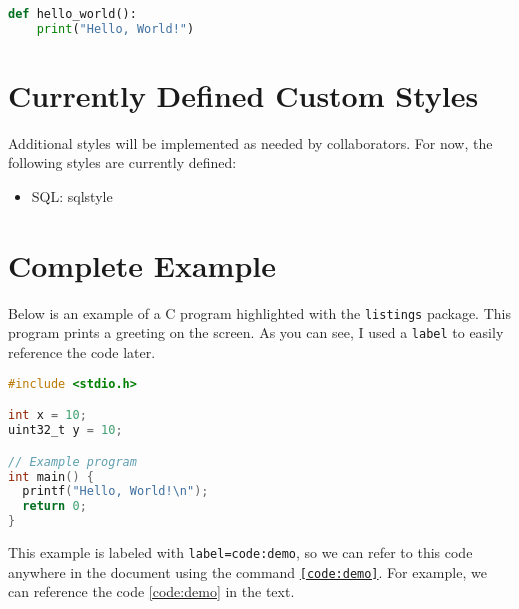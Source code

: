 
\begin{lstlisting}[language=Python]
	def hello_world():
	print("Hello, World!")
\end{lstlisting}

\section{Currently Defined Custom Styles}

Additional styles will be implemented as needed by collaborators. For now, the following styles are currently defined:

\begin{itemize}
	\item SQL: sqlstyle
\end{itemize}

\section{Complete Example}

Below is an example of a C program highlighted with the \texttt{listings} package. This program prints a greeting on the screen. As you can see, I used a \texttt{label} to easily reference the code later.

\begin{lstlisting}[language=C, style=hkn, caption={Demo}, label=code:demo]
#include <stdio.h>

int x = 10;
uint32_t y = 10;

// Example program
int main() {
  printf("Hello, World!\n");
  return 0;
}
\end{lstlisting}

This example is labeled with \texttt{label=code:demo}, so we can refer to this code anywhere in the document using the command \texttt{\ref{code:demo}}. For example, we can reference the code \ref{code:demo} in the text.
